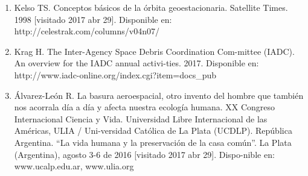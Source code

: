 \documentclass[12pt,letterpaper]{article}
\begin{document}
\begin{multicols}{2}
\begin{enumerate}
    \item {\scriptsize Kelso  TS.  Conceptos  básicos  de  la  órbita  geoestacionaria.  Satellite  Times.  1998  [visitado  2017  abr  29].  Disponible  en: http://celestrak.com/columns/v04n07/}
    
    \item {\scriptsize Krag H. The Inter-Agency Space Debris Coordination Com-mittee  (IADC).  An  overview  for  the  IADC  annual  activi-ties.  2017.  Disponible  en:  http://www.iadc-online.org/index.cgi?item=docs_pub}
    
    \item {\scriptsize Álvarez-León  R.  La  basura  aeroespacial,  otro  invento  del  hombre  que  también  nos  acorrala  día  a  día  y  afecta  nuestra  ecología humana. XX Congreso Internacional Ciencia y Vida. Universidad Libre Internacional de las Américas, ULIA / Uni-versidad Católica de La Plata (UCDLP). República Argentina. “La vida humana y la preservación de la casa común”. La Plata (Argentina), agosto 3-6 de 2016 [visitado 2017 abr 29]. Dispo-nible en: www.ucalp.edu.ar, www.ulia.org}
    \end{enumerate}
    \end{multicols}
    \newpage

    \pagestyle{fancy}
        \fancyhf{}
        \rhead{}
    
\end{document}
